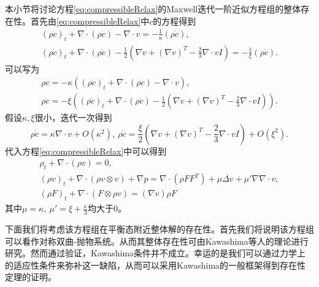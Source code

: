 \documentclass{article}
\begin{document}
本小节将讨论方程\eqref{eq:compressibleRelax}的Maxwell迭代一阶近似方程组的整体存在性。首先由\eqref{eq:compressibleRelax}中$c$的方程得到
\begin{eqnarray*}
    (\rho \dot{c})_t + \nabla \cdot (\rho \dot{c}) -  \nabla \cdot v  = - \frac{1}{\kappa} (\rho  \dot{c}), \\
    (\rho \mathring{c})_t + \nabla \cdot (\rho \mathring{c}) -  \frac{1}{2} (\nabla v + (\nabla v)^T  - \frac{2}{3} \nabla \cdot v I)  = - \frac{1}{\xi} (\rho  \mathring{c}).
\end{eqnarray*}
可以写为
\begin{eqnarray*}
    \rho \dot{c} = - \kappa\left( (\rho \dot{c})_t + \nabla \cdot (\rho \dot{c}) -  \nabla \cdot v\right), \\
    \rho \mathring{c} = - \xi \left( (\rho \mathring{c})_t + \nabla \cdot (\rho \mathring{c}) -  \frac{1}{2} (\nabla v + (\nabla v)^T  - \frac{2}{3} \nabla \cdot v I) \right).
\end{eqnarray*}
假设$\kappa,\xi$很小，迭代一次得到
\begin{equation*}
    \rho \dot{c} = \kappa \nabla \cdot v + O(\kappa^2), \ \rho \mathring{c} =  \frac{\xi}{2} (\nabla v + (\nabla v)^T  - \frac{2}{3} \nabla \cdot v I) + O(\xi^2).
\end{equation*}
代入方程\eqref{eq:compressibleRelax}中可以得到
\begin{subequations}\label{eq:compressible}
  \begin{align}
  \rho_t + \nabla \cdot (\rho  v ) = 0, \\
  (\rho  v )_t + \nabla \cdot ( \rho  v  \otimes  v ) + \nabla p = \nabla \cdot (\rho F F^T) + \mu \Delta  v  + \mu' \nabla \nabla \cdot  v , \\
  (\rho F)_t + \nabla \cdot (F \otimes \rho  v ) = (\nabla  v ) \rho F
\end{align}
\end{subequations}
其中$\mu = \kappa,\ \mu'=\xi + \frac{\kappa}{3}$均大于$0$。

下面我们将考虑该方程组在平衡态附近整体解的存在性。首先我们将说明该方程组可以看作对称双曲-抛物系统。从而其整体存在性可由Kawashima等人的理论\cite{}进行研究。然而通过验证，Kawashima条件并不成立。幸运的是我们可以通过力学上的适应性条件来弥补这一缺陷，从而可以采用Kawashima的一般框架得到存在性定理的证明。
\end{document}
